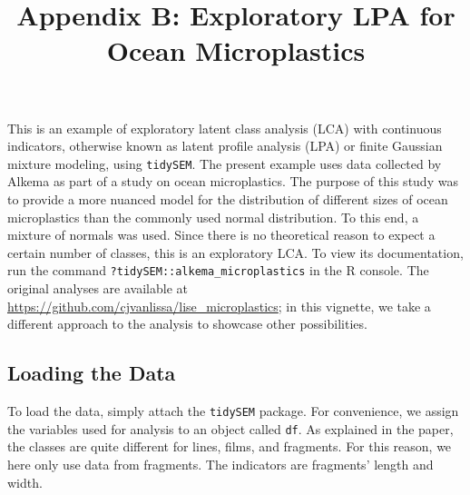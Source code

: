 \documentclass[
  man,floatsintext]{apa6}
\title{Appendix B: Exploratory LPA for Ocean Microplastics}
\author{\phantom{0}}
\date{}
\affiliation{\phantom{0}}
\newenvironment{Shaded}{\begin{snugshade}}{\end{snugshade}}
\newcommand{\CommentTok}[1]{\textcolor[rgb]{0.56,0.35,0.01}{\textit{#1}}}
\newcommand{\FunctionTok}[1]{\textcolor[rgb]{0.00,0.00,0.00}{#1}}
\newcommand{\NormalTok}[1]{#1}
\newcommand{\OtherTok}[1]{\textcolor[rgb]{0.56,0.35,0.01}{#1}}
\newcommand{\SpecialCharTok}[1]{\textcolor[rgb]{0.00,0.00,0.00}{#1}}
\newcommand{\StringTok}[1]{\textcolor[rgb]{0.31,0.60,0.02}{#1}}
\begin{document}
\maketitle

This is an example of exploratory latent class analysis (LCA) with continuous indicators, otherwise known as latent profile analysis (LPA) or finite Gaussian mixture modeling, using \texttt{tidySEM}.
The present example uses data collected by Alkema as part of a study on ocean microplastics.
The purpose of this study was to provide a more nuanced model for the distribution of different sizes of ocean microplastics than the commonly used normal distribution.
To this end, a mixture of normals was used.
Since there is no theoretical reason to expect a certain number of classes, this is an exploratory LCA.
To view its documentation, run the command \texttt{?tidySEM::alkema\_microplastics} in the R console.
The original analyses are available at \url{https://github.com/cjvanlissa/lise_microplastics}; in this vignette, we take a different approach to the analysis to showcase other possibilities.

\hypertarget{loading-the-data}{%
\subsection{Loading the Data}\label{loading-the-data}}

To load the data, simply attach the \texttt{tidySEM} package.
For convenience, we assign the variables used for analysis to an object called \texttt{df}.
As explained in the paper, the classes are quite different for lines, films, and fragments.
For this reason, we here only use data from fragments.
The indicators are fragments' length and width.

\begin{Shaded}
\end{Shaded}
\end{document}
